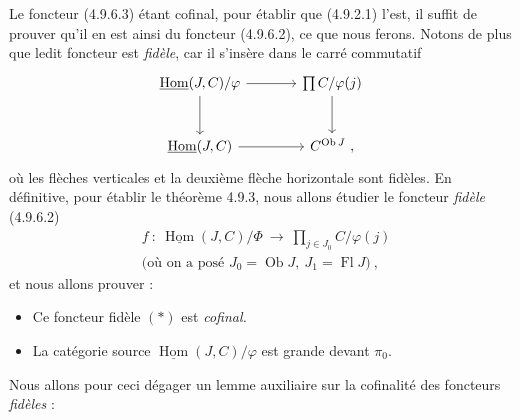 \documentclass[11pt]{article}
\newcommand{\printedpage}[1]{\marginpar{\footnotesize p.~#1}}
\newcommand{\msp}[1]{\marginpar{\footnotesize [#1]}}
\newcommand{\Fl}{\operatorname{Fl}}
\newcommand{\Ob}{\operatorname{Ob}}
\newcommand{\uHom}{\underline{\operatorname{Hom}}}
\begin{document}
\msp{page 223}Le foncteur (4.9.6.3) étant cofinal, pour établir que (4.9.2.1) l'est, il suffit de prouver qu'il en est ainsi du foncteur (4.9.6.2), ce que nous ferons. Notons de plus que ledit foncteur est \textit{fidèle}, car il s'insère dans le carré commutatif
\[
\begin{tikzcd}[column sep=large, row sep=large]
\uHom(J,C)/\varphi \arrow[r] \arrow[d] & \prod C/\varphi(j) \arrow[d] \\
\uHom(J,C) \arrow[r] & C^{\Ob J}\ ,
\end{tikzcd}
\]
\printedpage{81}
où les flèches verticales et la deuxième flèche horizontale sont fidèles. En définitive, pour établir le théorème 4.9.3, nous allons étudier le foncteur \textit{fidèle} (4.9.6.2)
\[
\begin{aligned}
&f \ : \ \uHom(J,C)/\Phi \ \longrightarrow \ \textstyle\prod_{j \in J_0} C/\varphi(j) \\ %
&\text{(où on a posé } J_0 = \Ob J,\ J_1 = \Fl J) \ ,
\end{aligned}
\tag*{$(*)$}
\]
et nous allons prouver :
\begin{itemize}[label={}]
\item[\textcircled{a}] Ce foncteur fidèle $(*)$ est \textit{cofinal.}
\item[\textcircled{b}] La catégorie source $\uHom(J,C)/\varphi$ est grande devant $\pi_0$.
\end{itemize}
Nous allons pour ceci dégager un lemme auxiliaire sur la cofinalité des foncteurs \textit{fidèles} :
\end{document}
